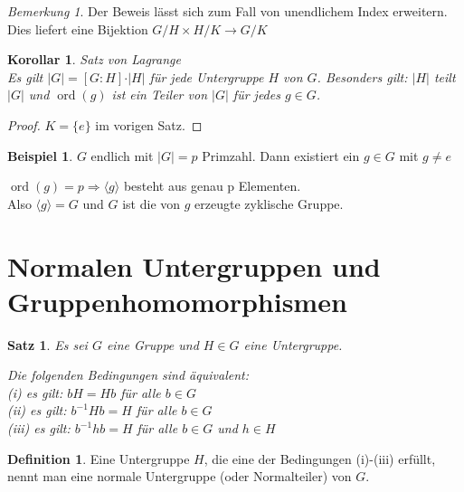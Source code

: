 \documentclass[12pt]{scrartcl}%
\newtheorem{thm}{Satz}
\newtheorem{kor}{Korollar}
\theoremstyle{definition}
\newtheorem*{defn}{Definition}
\newtheorem{ex}{Beispiel}
\theoremstyle{remark}
\newtheorem*{nb}{Bemerkung}
\DeclareMathOperator\ord{ord}
\begin{document}
\begin{nb}
Der Beweis lässt sich zum Fall von unendlichem Index erweitern. Dies liefert eine Bijektion $G/H \times H/K \to G/K$
\end{nb}

\begin{kor}{Satz von Lagrange}\\
Es gilt $\vert G\vert = [G:H]\cdot\vert H\vert$ für jede Untergruppe  $H$ von $G$. Besonders gilt: $\vert H\vert$ teilt $\vert G\vert$ und $\ord(g)$ ist ein Teiler von  $\vert G\vert$ für jedes $g\in G$.
\end{kor}

\begin{proof}
$K= \{ e\}$ im vorigen Satz.
\end{proof}

\begin{ex}
$G$ endlich mit $\vert G\vert=p$ Primzahl. Dann existiert ein $g \in G$ mit $g \neq e$

$\ord(g)=p \Rightarrow\langle g\rangle$ besteht aus genau p Elementen.\\
Also $\langle g\rangle=G$ und $G$ ist die von $g$ erzeugte zyklische Gruppe.
\end{ex}

\section{Normalen Untergruppen und Gruppenhomomorphismen}

\begin{thm}
Es sei $G$ eine Gruppe und $H\in G$ eine Untergruppe.

Die folgenden Bedingungen sind äquivalent:\\
(i) es gilt: $bH=Hb$ für alle $b\in G$\\
(ii) es gilt: $b^{-1}Hb=H$ für alle $b\in G$\\
(iii) es gilt: $b^{-1}hb=H$ für alle $b\in G$ und $h\in H$
\end{thm}

\begin{defn}
Eine Untergruppe $H$, die eine der Bedingungen (i)-(iii) erfüllt, nennt man eine normale Untergruppe (oder Normalteiler) von $G$.
\end{defn}
\end{document}
